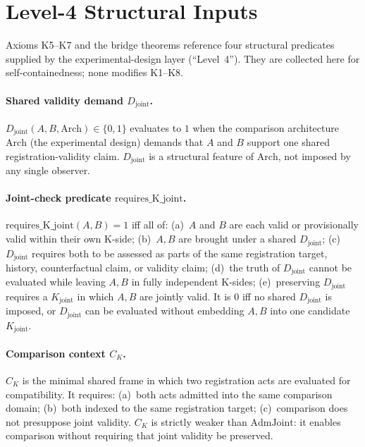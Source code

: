 \documentclass[12pt,a4paper]{article}
\theoremstyle{plain}
\theoremstyle{definition}
\theoremstyle{remark}
\newcommand{\Kjoint}{K_{\mathrm{joint}}}
\newcommand{\CK}{C_K}
\begin{document}
\section{Level-4 Structural Inputs}
\label{app:level4}

Axioms K5--K7 and the bridge theorems reference four structural predicates
supplied by the experimental-design layer (``Level~4''). They are collected
here for self-containedness; none modifies K1--K8.

\paragraph{Shared validity demand $D_{\mathrm{joint}}$.}
$D_{\mathrm{joint}}(A,B,\mathrm{Arch}) \in \{0,1\}$ evaluates to $1$ when the
comparison architecture $\mathrm{Arch}$ (the experimental design) demands that
$A$ and $B$ support one shared registration-validity claim. $D_{\mathrm{joint}}$
is a structural feature of $\mathrm{Arch}$, not imposed by any single observer.

\paragraph{Joint-check predicate $\mathrm{requires\_K\_joint}$.}
$\mathrm{requires\_K\_joint}(A,B) = 1$ iff all of:
(a)~$A$ and $B$ are each valid or provisionally valid within their own K-side;
(b)~$A,B$ are brought under a shared $D_{\mathrm{joint}}$;
(c)~$D_{\mathrm{joint}}$ requires both to be assessed as parts of the same
registration target, history, counterfactual claim, or validity claim;
(d)~the truth of $D_{\mathrm{joint}}$ cannot be evaluated while leaving $A,B$ in
fully independent K-sides;
(e)~preserving $D_{\mathrm{joint}}$ requires a $\Kjoint$ in which $A,B$ are
jointly valid.
It is $0$ iff no shared $D_{\mathrm{joint}}$ is imposed, or $D_{\mathrm{joint}}$
can be evaluated without embedding $A,B$ into one candidate $\Kjoint$.

\paragraph{Comparison context $\CK$.}
$\CK$ is the minimal shared frame in which two registration acts are evaluated
for compatibility. It requires: (a)~both acts admitted into the same comparison
domain; (b)~both indexed to the same registration target; (c)~comparison does
not presuppose joint validity. $\CK$ is strictly weaker than
$\mathrm{AdmJoint}$: it enables comparison without requiring that joint validity
be preserved.
\end{document}
